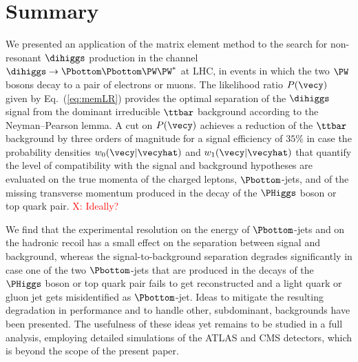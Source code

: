 \section{Summary}
\label{sec:summary}

We presented an application of the matrix element method 
to the search for non-resonant $\dihiggs$ production in the channel $\dihiggs \to \Pbottom\Pbottom\PW\PW^{*}$ at LHC,
in events in which the two $\PW$ bosons decay to a pair of electrons or muons.
The likelihood ratio $P(\vecy)$ given by Eq.~(\ref{eq:memLR}) provides the optimal separation of the $\dihiggs$ signal from the dominant irreducible $\ttbar$ background
according to the Neyman–Pearson lemma.
A cut on $P(\vecy)$ achieves a reduction of the $\ttbar$ background by three orders of magnitude for a signal efficiency of $35\%$
in case the probability densities $w_{0}(\vecy|\vecyhat)$ and $w_{1}(\vecy|\vecyhat)$ that quantify the level of compatibility with the signal and background hypotheses
are evaluated on the true momenta of the charged leptons, $\Pbottom$-jets, and of the missing transverse momentum produced in the decay of the $\PHiggs$ boson or top quark pair. \textcolor{red}{X: Ideally? } 

We find that the experimental resolution on the energy of $\Pbottom$-jets and on the hadronic recoil has a small effect on the separation between signal and background,
whereas the signal-to-background separation degrades significantly in case one of the two $\Pbottom$-jets that are produced in the decays of the $\PHiggs$ boson or top quark pair
fails to get reconstructed and a light quark or gluon jet gets misidentified as $\Pbottom$-jet.
Ideas to mitigate the resulting degradation in performance and to handle other, subdominant, backgrounds have been presented.
The usefulness of these ideas yet remains to be studied in a full analysis, employing detailed simulations of the ATLAS and CMS detectors, which is beyond the scope of the present paper.
